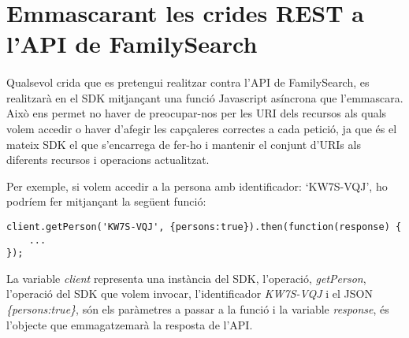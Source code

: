 \section{Emmascarant les crides REST a l'API de Family\-Search}

    \paragraph{}
    Qualsevol crida que es pretengui realitzar contra l’API de FamilySearch, es re\-a\-lit\-za\-rà en el SDK mitjançant una funció Javascript asíncrona que l'emmascara. Això ens permet no haver de preocupar-nos per les URI dels recursos als quals volem accedir o haver d'afegir les capçaleres correctes a cada petició, ja que és el mateix SDK el que s'encarrega de fer-ho i mantenir el conjunt d'URIs als diferents recursos i operacions actualitzat.

    Per exemple, si volem accedir a la persona amb identificador: `KW7S-VQJ', ho podríem fer mitjançant la següent funció:

\begin{lstlisting}[style=rawOwn,caption={Exempla crida emmascarada a l'API de FamilySearch}]
client.getPerson('KW7S-VQJ', {persons:true}).then(function(response) {
    ...
});
\end{lstlisting}

    La variable \emph{client} representa una instància del SDK, l’operació, \emph{getPerson}, l’ope\-ra\-ció del SDK que volem invocar, l’identificador \emph{KW7S-VQJ} i el JSON \emph{\{persons:true\}}, són els paràmetres a passar a la funció i la variable \emph{response}, és l’objecte que emmagatzemarà la resposta de l’API.
